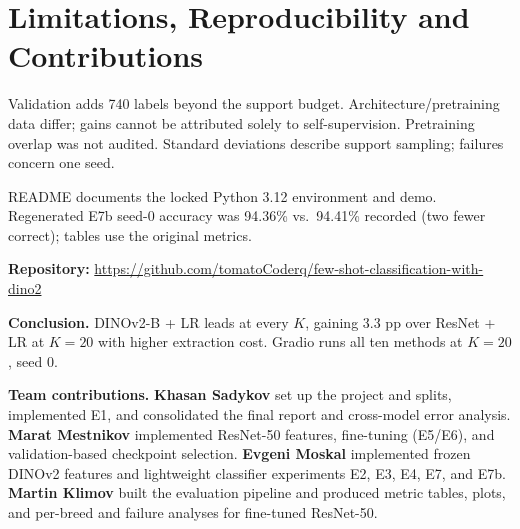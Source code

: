 \documentclass[10pt]{article}
\begin{document}
\section{Limitations, Reproducibility and Contributions}
Validation adds 740 labels beyond the support budget. Architecture/pretraining data
differ; gains cannot be attributed solely to self-supervision. Pretraining overlap
was not audited. Standard deviations describe support sampling; failures concern one seed.

README documents the locked Python 3.12 environment and demo. Regenerated E7b seed-0 accuracy
was 94.36\% vs.\ 94.41\% recorded (two fewer correct); tables use the original metrics.

\textbf{Repository:} \url{https://github.com/tomatoCoderq/few-shot-classification-with-dino2}

\textbf{Conclusion.} DINOv2-B + LR leads at every $K$, gaining 3.3 pp over
ResNet + LR at $K=20$ with higher extraction cost. Gradio runs all ten methods
at $K=20$, seed 0.

\textbf{Team contributions.}
\textbf{Khasan Sadykov} set up the project and splits, implemented E1, and
consolidated the final report and cross-model error analysis.
\textbf{Marat Mestnikov} implemented ResNet-50 features, fine-tuning (E5/E6),
and validation-based checkpoint selection.
\textbf{Evgeni Moskal} implemented frozen DINOv2 features and lightweight
classifier experiments E2, E3, E4, E7, and E7b.
\textbf{Martin Klimov} built the evaluation pipeline and produced metric tables,
plots, and per-breed and failure analyses for fine-tuned ResNet-50.
\end{document}
